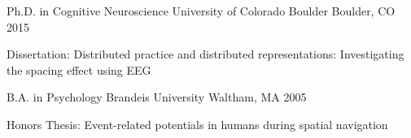 

\begin{cventries}

  \cventry
    {Ph.D. in Cognitive Neuroscience} %
    {University of Colorado Boulder} %
    {Boulder, CO} %
    {2015} %
    {
      \begin{cvitems} %
        \item {Dissertation: Distributed practice and distributed representations: Investigating the spacing effect using EEG}
      \end{cvitems}
    }

  \cventry
    {B.A. in Psychology} %
    {Brandeis University} %
    {Waltham, MA} %
    {2005} %
    {
      \begin{cvitems} %
        \item {Honors Thesis: Event-related potentials in humans during spatial navigation}
      \end{cvitems}
    }

\end{cventries}
